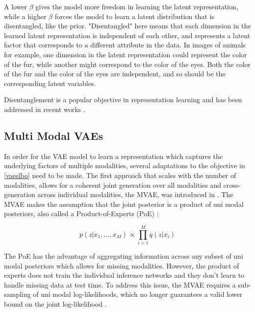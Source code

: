 A lower $\beta$ gives the model more freedom in learning the latent representation, while a higher $\beta$ forces the model to learn a latent distribution that is disentangled, like the prior.
"Disentangled" here means that each dimension in the learned latent representation is independent of each other, and represents a latent factor that corresponds to a different attribute in the data.
In images of animals for example, one dimension in the latent representation could represent the color of the fur, while another might correspond to the color of the eyes.
Both the color of the fur and the color of the eyes are independent, and so should be the corresponding latent variables.



Disentanglement is a popular objective in representation learning and has been addressed in recent works \parencite{chen_isolating_2019, locatello_challenging_2019}.

\subsection{Multi Modal VAEs}
In order for the VAE model to learn a representation which captures the underlying factors of multiple modalities, several adaptations to the objective in \cref{vaeelbo} need to be made.
The first approach that scales with the number of modalities, allows for a coherent joint generation over all modalities and cross-generation across individual modalities, the MVAE, was introduced in \cite{poe}.
The MVAE makes the assumption that the joint posterior is a product of uni modal posteriors, also called a Product-of-Experts (PoE) \parencite{hinton_training_2002}:

\begin{equation}
    p(z|x_1,\ldots,x_M) \propto \prod ^M _{i=1} q(z|x_i)
\end{equation}

The PoE has the advantage of aggregating information across any subset of uni modal posteriors which allows for missing modalities.
However, the product of experts does not train the individual inference networks and they don't learn to handle missing data at test time.
To address this issue, the MVAE requires a sub-sampling of uni modal log-likelihoods, which no longer guarantees a valid lower bound on the joint log-likelihood \parencite{wu_multimodal_2019}.

